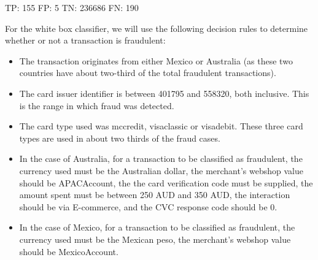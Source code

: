 \documentclass[]{article}
\begin{document}
\begin{flushleft}
TP: 155 \newline
FP: 5  \newline
TN: 236686 \newline
FN: 190 \newline
\end{flushleft}

For the white box classifier, we will use the following decision rules to determine whether or not a transaction is fraudulent:
\begin{itemize}
	\item The transaction originates from either Mexico or Australia (as these two countries have about two-third of the total fraudulent transactions).
	\item The card issuer identifier is between 401795 and 558320, both inclusive. This is the range in which fraud was detected.
	\item The card type used was mccredit, visaclassic or visadebit. These three card types are used in about two thirds of the fraud cases.
	\item In the case of Australia, for a transaction to be classified as fraudulent, the currency used must be the Australian dollar, the merchant's webshop value should be APACAccount, the the card verification code must be supplied, the amount spent must be between 250 AUD and 350 AUD, the interaction should be via E-commerce, and the CVC response code should be 0.
	\item In the case of Mexico, for a transaction to be classified as fraudulent, the currency used must be the Mexican peso, the merchant's webshop value should be MexicoAccount.
\end{itemize}
\end{document}
